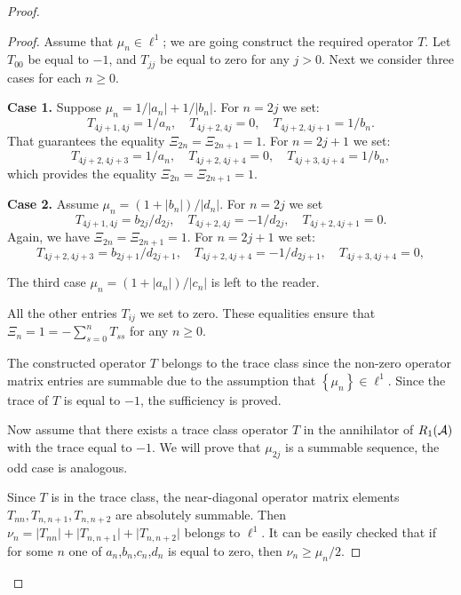 \begin{proof}
\begin{proof}
        Assume that $\mu_n \in \ell^1$; we are going construct the required operator $T$.
        Let $T_{00}$ be equal to $-1$, and $T_{jj}$ be equal to zero for any $j > 0$.
        Next we consider three cases for each $n \geq 0$.

        \noindent\textbf{Case 1.}
        Suppose $\mu_n = 1/|a_n| + 1/|b_n|$.
        For $n=2j$ we set:
        \[
          T_{4j+1,4j}=1/a_n, \quad T_{4j+2,4j} = 0, \quad T_{4j+2,4j+1}=1/b_n.
        \]
        That guarantees the equality $\Xi_{2n} = \Xi_{2n+1} = 1$.
        For $n=2j+1$ we set:
        \[
          T_{4j+2,4j+3}=1/a_n, \quad T_{4j+2,4j+4} = 0, \quad T_{4j+3,4j+4}=1/b_n,
        \]
        which provides the equality $\Xi_{2n} = \Xi_{2n+1} = 1$.

        \noindent\textbf{Case 2.}
        Assume $\mu_n = (1 + |b_n|)/|d_n|$.
        For $n=2j$ we set
        \[
          T_{4j+1,4j} = b_{2j}/d_{2j}, \quad T_{4j+2,4j} = -1/d_{2j}, \quad T_{4j+2,4j+1} = 0.
        \]
        Again, we have $\Xi_{2n} = \Xi_{2n+1} = 1$.
        For $n = 2j + 1$ we set:
        \[ 
          T_{4j+2,4j+3}=b_{2j+1}/d_{2j+1},  \quad T_{4j+2,4j+4} = -1/d_{2j+1}, \quad T_{4j+3,4j+4}=0,
        \]

        The third case $\mu_n = (1 + |a_n|)/|c_n|$ is left to the reader.
        \medskip

        All the other entries $T_{ij}$ we set to zero.
        These equalities ensure that $\Xi_n = 1 = -\sum_{s=0}^n T_{ss}$ for any $n \geq 0$.

        The constructed operator $T$ belongs to the trace class since the non-zero operator matrix entries are summable
          due to the assumption that $\left\{\mu_n\right\} \in \ell^1$.
        Since the trace of $T$ is equal to $-1$, the sufficiency is proved.

        Now assume that there exists a trace class operator $T$ in the annihilator of $R_1(\cal{A})$ with the trace equal to $-1$.
        We will prove that $\mu_{2j}$ is a summable sequence, the odd case is analogous.

        Since $T$ is in the trace class, the near-diagonal operator matrix elements $T_{nn}, T_{n, n+1}, T_{n, n+2}$ are absolutely summable.
        Then $\nu_n = \lvert T_{nn} \rvert + \lvert T_{n, n + 1} \rvert + \lvert T_{n, n+2} \rvert$ belongs to $\ell^1$.
        It can be easily checked that if for some $n$ one of $a_n$,$b_n$,$c_n$,$d_n$ is equal to zero, then $\nu_n \geq \mu_n/2$.


\end{proof}
\end{proof}
